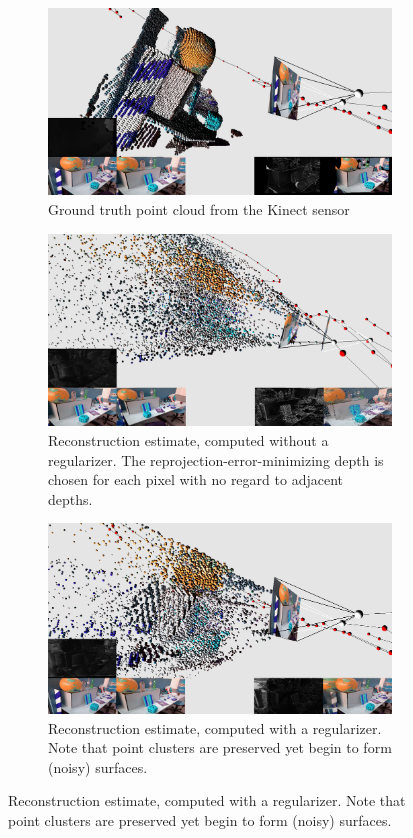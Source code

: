\documentclass[conference]{IEEEtran}
\begin{document}
\begin{figure}[htbp]
\begin{subfigure}[b]{0.5\textwidth}
\centerline{\includegraphics[width=\textwidth]{figures/cloud_groundtruth.png}}
\caption{Ground truth point cloud from the Kinect sensor}
\label{cloud_groundtruth}
\end{subfigure}
\begin{subfigure}[b]{0.5\textwidth}
\centerline{\includegraphics[width=\textwidth]{figures/cloud_noregularizer.png}}
\caption{Reconstruction estimate, computed without a regularizer. The reprojection-error-minimizing depth is chosen for each pixel with no regard to adjacent depths.}
\label{cloud_noregularizer}
\end{subfigure}
\begin{subfigure}[b]{0.5\textwidth}
\centerline{\includegraphics[width=\textwidth]{figures/cloud_computed.png}}
\caption{Reconstruction estimate, computed with a regularizer. Note that point clusters are preserved yet begin to form (noisy) surfaces.}
\label{cloud_computed}
\end{subfigure}
\end{figure}
\end{document}
